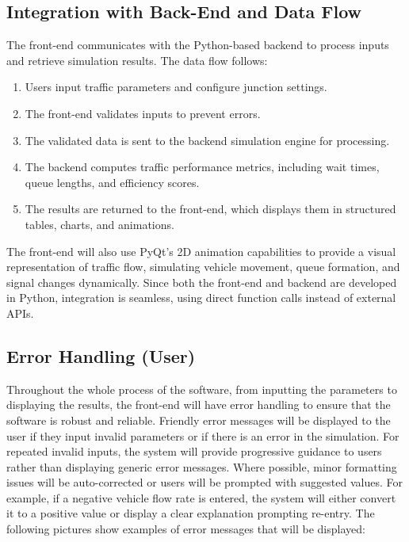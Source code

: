 \documentclass{article}
\begin{document}
\subsection{Integration with Back-End and Data Flow}
The front-end communicates with the Python-based backend to process inputs and retrieve simulation results. The data flow follows:
\begin{enumerate}
    \item Users input traffic parameters and configure junction settings.
    \item The front-end validates inputs to prevent errors.
    \item The validated data is sent to the backend simulation engine for processing.
    \item The backend computes traffic performance metrics, including wait times, queue lengths, and efficiency scores.
    \item The results are returned to the front-end, which displays them in structured tables, charts, and animations.
\end{enumerate}

The front-end will also use PyQt’s 2D animation capabilities to provide a visual
representation of traffic flow, simulating vehicle movement, queue formation, and signal
changes dynamically. Since both the front-end and backend are developed in Python,
integration is seamless, using direct function calls instead of external APIs.

\subsection{Error Handling (User)}
Throughout the whole process of the software, from inputting the parameters to displaying the results, the front-end will have error handling to ensure that the software is robust and reliable.
Friendly error messages will be displayed to the user if they input invalid parameters or if there is an error in the simulation. For repeated invalid inputs, the system will provide progressive guidance to users rather
than displaying generic error messages. Where possible, minor formatting issues will be
auto-corrected or users will be prompted with suggested values. For example, if a negative
vehicle flow rate is entered, the system will either convert it to a positive value or display a
clear explanation prompting re-entry. The following pictures show examples of error messages that will be displayed:
\end{document}
